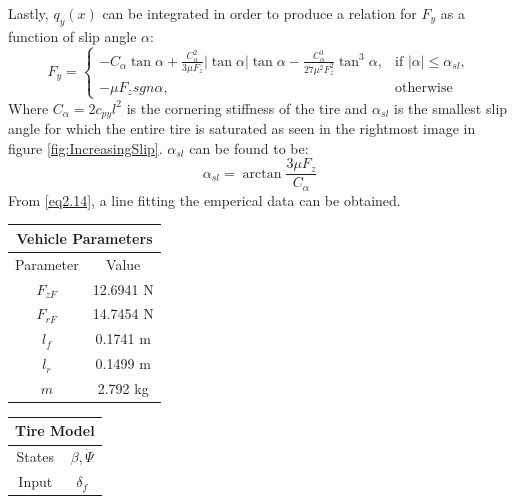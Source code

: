 \documentclass{article}
\numberwithin{equation}{section}
\begin{document}
Lastly, $q_y(x)$ can be integrated in order to produce a relation for $F_y$ as a  function of slip angle $\alpha$:
\begin{equation}\label{eq2.14}
F_y =
\begin{cases} 
      -C_\alpha\tan{\alpha} + 
       \frac{C_\alpha^2}{3\mu F_z}|\tan{\alpha}|\tan{\alpha} - \frac{C_\alpha^3}{27\mu^2 F_z^2}\tan^3{\alpha}, & \text{if $|\alpha|\leq\alpha_{sl}$},\\
      -\mu F_z sgn\alpha, & \text{otherwise}
   \end{cases}
\end{equation}
Where $C_\alpha = 2c_{py}l^2$ is the cornering stiffness of the tire and  $\alpha_{sl}$ is the smallest slip angle for which the entire tire is saturated as seen in the rightmost image in figure \ref{fig:IncreasingSlip}. $\alpha_{sl}$ can be found to be:
\begin{equation}\label{eq2.15}
    \alpha_{sl} = \arctan{\frac{3\mu F_z}{C_\alpha}}
\end{equation}
From \eqref{eq2.14}, a line fitting the emperical data can be obtained.

\renewcommand{\arraystretch}{1.5}
\begin{table}[H]
\centering
 \begin{tabular}{ |c|c|  }
 \hline
 \multicolumn{2}{|c|}{Vehicle Parameters} \\
 \hline
 Parameter & Value \\ [0.5ex] 
 \hline
 $F_{zF}$ & 12.6941 N \\ 
 $F_{rF}$ & 14.7454 N \\
 $l_f$ & 0.1741 m\\
 $l_r$ & 0.1499 m\\
 $m$ & 2.792 kg \\ [1ex] 
 \hline
 \end{tabular}
\end{table}

\begin{table}[H]
\centering
 \begin{tabular}{ |c|c|  }
 \hline
 \multicolumn{2}{|c|}{Tire Model} \\
 \hline
 States &  $\beta,\dot{\Psi}$\\ 
 Input & $\delta_f$ \\ [1ex] 
 \hline
 \end{tabular}
\end{table}



\printbibliography %
\end{document}
